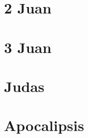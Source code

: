 \chapter{2 Juan}
\begin{multicols}{2}
  \raggedcolumns
  \parskip=0pt \relax
  
\end{multicols}

\chapter{3 Juan}
\begin{multicols}{2}
  \raggedcolumns
  \parskip=0pt \relax
  
\end{multicols}

\chapter{Judas}
\begin{multicols}{2}
  \raggedcolumns
  \parskip=0pt \relax
  
\end{multicols}

\chapter{Apocalipsis}
\begin{multicols}{2}
  \raggedcolumns
  \parskip=0pt \relax
  
\end{multicols}
\newpage





















